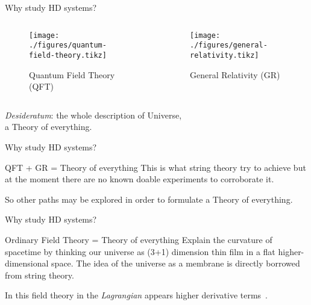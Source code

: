 \begin{frame}{Why study HD systems?}
  \begin{columns}
    \begin{column}{0.5\textwidth}
      \begin{figure}
        \texttt{[image: ./figures/quantum-field-theory.tikz]}
        \caption[labelformat=empty]{Quantum Field Theory (QFT)}\label{fig:QFT}
      \end{figure}
    \end{column}
    \begin{column}{0.5\textwidth}
      \begin{figure}
        \texttt{[image: ./figures/general-relativity.tikz]}
        \caption[labelformat=empty]{General Relativity (GR)}\label{fig:GR}
      \end{figure}
    \end{column}
  \end{columns}
  \vspace{1em}
  \begin{center}
    \emph{Desideratum}: the whole description of Universe, \\
    a \alert{Theory of everything}.
  \end{center}
\end{frame}

\begin{frame}{Why study HD systems?}
  \begin{alertblock}{QFT + GR = Theory of everything}
      \vspace{0.5em}
      This is what string theory try to achieve but at the moment there are
      no known doable experiments to corroborate it.
  \end{alertblock}
  So other paths may be explored in order to formulate a Theory of everything.
\end{frame}

\begin{frame}{Why study HD systems?}
  \begin{alertblock}{Ordinary Field Theory = Theory of everything}
    \vspace{0.5em}
      Explain the curvature of spacetime by thinking our universe as (3+1)
      dimension thin film in a flat higher-dimensional space. The idea of the
      universe as a membrane is directly borrowed from string theory.
  \end{alertblock}
  In this field theory in the \emph{Lagrangian} appears \alert{higher
  derivative terms}~\cite{Smilga17}.
\end{frame}
